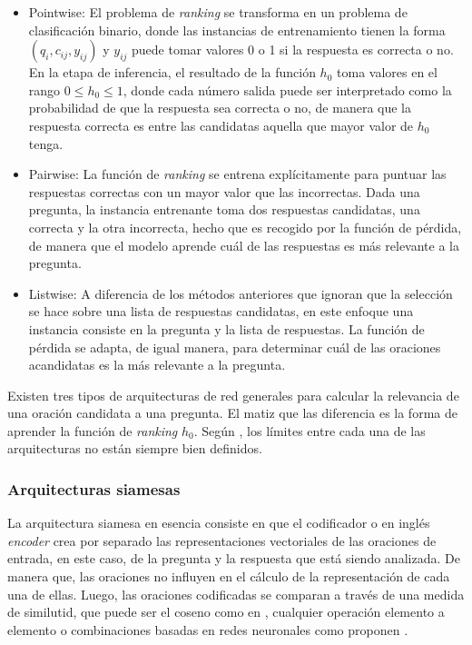 \begin{itemize}
	\item Pointwise: El problema de \textit{ranking} se transforma en un problema de clasificación binario, donde las instancias de entrenamiento tienen la forma $(q_{i}, c_{ij}, y_{ij})$ y $y_{ij}$ puede tomar valores 0 o 1 si la respuesta es correcta o no. En la etapa de inferencia, el resultado de la función $h_{0}$ toma valores en el rango $0 \leq h_{0} \leq 1$, donde cada número salida puede ser interpretado como la probabilidad de que la respuesta sea correcta o no, de manera que la respuesta correcta es entre las candidatas aquella que mayor valor de $h_0$ tenga.
	\item Pairwise: La función de \textit{ranking} se entrena explícitamente para puntuar las respuestas correctas con un mayor valor que las incorrectas. Dada una pregunta, la instancia entrenante toma dos respuestas candidatas, una correcta y la otra incorrecta, hecho que es recogido por la función de pérdida, de manera que el modelo aprende cuál de las respuestas es más relevante a la pregunta. 
	\item Listwise: A diferencia de los métodos anteriores que ignoran que la selección se hace sobre una lista de respuestas candidatas, en este enfoque una instancia consiste en la pregunta y la lista de respuestas. La función de pérdida se adapta, de igual manera, para determinar cuál de las oraciones acandidatas es la más relevante a la pregunta.
\end{itemize}

Existen tres tipos de arquitecturas de red generales para calcular la relevancia de una oración candidata a una pregunta. El matiz que las diferencia es la forma de aprender la función de \textit{ranking} $h_{0}$. Según \cite{2018-lai-review}, los límites entre cada una de las arquitecturas no están siempre bien definidos.

\subsubsection{Arquitecturas siamesas}

La arquitectura siamesa en esencia consiste en que el codificador o en inglés \textit{encoder} crea por separado las representaciones vectoriales de las oraciones de entrada, en este caso, de la pregunta y la respuesta que está siendo analizada. De manera que, las oraciones no influyen en el cálculo de la representación de cada una de ellas. Luego, las oraciones codificadas se comparan a través de una medida de similutid, que puede ser el coseno como en \cite{2015-feng-siamese-cosine}, cualquier operación elemento a elemento \cite{2015-tai-element-wise} o combinaciones basadas en redes neuronales como proponen \cite{2015-manning-inference}.

